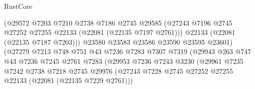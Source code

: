 \begin{lexlean}{RustCore}
\begin{coremodule}
                                    (@29572
                                      @7203
                                      @7210
                                      @2738
                                      @7186
                                      @2745
                                      @29585
                                      (@27243
                                        @7196
                                        @2745
                                        @27252
                                        @27255
                                        @22133
                                        (@22081 (@22135 @7197 @2761)))
                                      @22133
                                      (@22081 (@22135 @7187 @7203)))
                                    @23580
                                    @23583
                                    @23586
                                    @23590
                                    @23595
                                    @23601)
                                  (@27279
                                    @7213
                                    @748
                                    @751
                                    @43
                                    @7236
                                    @7283
                                    @7307
                                    @7319
                                    (@29943
                                      @263
                                      @747
                                      @43
                                      @7236
                                      @7245
                                      @2761
                                      @7283
                                      (@29953
                                        @7236
                                        @7243
                                        @3230
                                        (@29961
                                          @7235
                                          @7242
                                          @2738
                                          @7218
                                          @2745
                                          @29976
                                          (@27243
                                            @7228
                                            @2745
                                            @27252
                                            @27255
                                            @22133
                                            (@22081 (@22135 @7229 @2761)))

\end{coremodule}
\end{lexlean}
